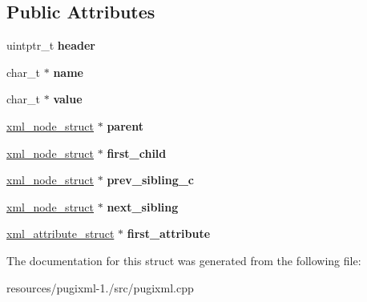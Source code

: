 \subsection*{Public Attributes}
\begin{DoxyCompactItemize}
\item 
\hypertarget{structpugi_1_1xml__node__struct_aea2e405a368dc5a278a2d23465f1975c}{uintptr\+\_\+t {\bfseries header}}\label{structpugi_1_1xml__node__struct_aea2e405a368dc5a278a2d23465f1975c}

\item 
\hypertarget{structpugi_1_1xml__node__struct_ae2324fdbd1e307fb12007d1d0f957a0b}{char\+\_\+t $\ast$ {\bfseries name}}\label{structpugi_1_1xml__node__struct_ae2324fdbd1e307fb12007d1d0f957a0b}

\item 
\hypertarget{structpugi_1_1xml__node__struct_a191e708864fccda17bb66157afdadd2d}{char\+\_\+t $\ast$ {\bfseries value}}\label{structpugi_1_1xml__node__struct_a191e708864fccda17bb66157afdadd2d}

\item 
\hypertarget{structpugi_1_1xml__node__struct_af692c222bcc5a9f61108cb3ae0b7b5ea}{\hyperlink{structpugi_1_1xml__node__struct}{xml\+\_\+node\+\_\+struct} $\ast$ {\bfseries parent}}\label{structpugi_1_1xml__node__struct_af692c222bcc5a9f61108cb3ae0b7b5ea}

\item 
\hypertarget{structpugi_1_1xml__node__struct_af72c49a0f81928ef664d9d2f0260f23d}{\hyperlink{structpugi_1_1xml__node__struct}{xml\+\_\+node\+\_\+struct} $\ast$ {\bfseries first\+\_\+child}}\label{structpugi_1_1xml__node__struct_af72c49a0f81928ef664d9d2f0260f23d}

\item 
\hypertarget{structpugi_1_1xml__node__struct_a74e62128c88c422c0ed969633bbb2d4e}{\hyperlink{structpugi_1_1xml__node__struct}{xml\+\_\+node\+\_\+struct} $\ast$ {\bfseries prev\+\_\+sibling\+\_\+c}}\label{structpugi_1_1xml__node__struct_a74e62128c88c422c0ed969633bbb2d4e}

\item 
\hypertarget{structpugi_1_1xml__node__struct_acf0867e3a77871e37132046d97398a6d}{\hyperlink{structpugi_1_1xml__node__struct}{xml\+\_\+node\+\_\+struct} $\ast$ {\bfseries next\+\_\+sibling}}\label{structpugi_1_1xml__node__struct_acf0867e3a77871e37132046d97398a6d}

\item 
\hypertarget{structpugi_1_1xml__node__struct_a482d2daf97ce0745661cb2c57d8f6fb3}{\hyperlink{structpugi_1_1xml__attribute__struct}{xml\+\_\+attribute\+\_\+struct} $\ast$ {\bfseries first\+\_\+attribute}}\label{structpugi_1_1xml__node__struct_a482d2daf97ce0745661cb2c57d8f6fb3}

\end{DoxyCompactItemize}


The documentation for this struct was generated from the following file\+:\begin{DoxyCompactItemize}
\item 
resources/pugixml-\/1./src/pugixml.\+cpp\end{DoxyCompactItemize}
